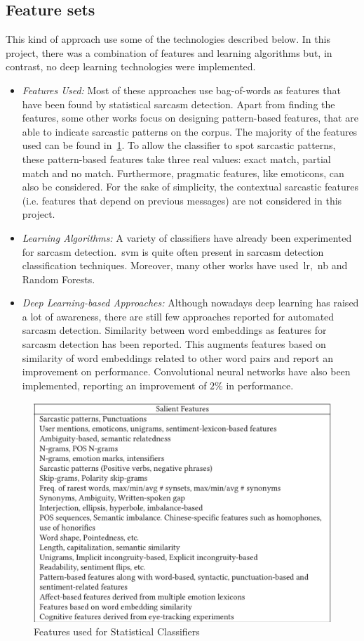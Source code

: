 \subsection{Feature sets \cite{joshi2017automatic}}
This kind of approach use some of the technologies described below. In this project, there was a combination of features and learning algorithms but, in contrast, no deep learning technologies were implemented.
\begin{itemize}
	\item \textit{Features Used:} Most of these approaches use bag-of-words as features that have been found by statistical sarcasm detection. Apart from finding the features, some other works focus on designing pattern-based features, that are able to indicate sarcastic patterns on the corpus. The majority of the features used can be found in~\cref{fig:featused}. To allow the classifier to spot sarcastic patterns, these pattern-based features take three real values: exact match, partial match and no match. Furthermore, pragmatic features, like emoticons, can also be considered. For the sake of simplicity, the contextual sarcastic features (i.e. features that depend on previous messages) are not considered in this project.
	\item \textit{Learning Algorithms:} A variety of classifiers have already been experimented for sarcasm detection.~\acf{svm} is quite often present in sarcasm detection classification techniques. Moreover, many other works have used~\acf{lr},~\acf{nb} and Random Forests.
	\item \textit{Deep Learning-based Approaches:} Although nowadays deep learning has raised a lot of awareness, there are still few approaches reported for automated sarcasm detection. Similarity between word embeddings as features for sarcasm detection has been reported. This augments features based on similarity of word embeddings related to other word pairs and report an improvement on performance. Convolutional neural networks have also been implemented, reporting an improvement of $2\%$ in performance.
\end{itemize}
\begin{figure}
\centering
\includegraphics[scale=0.25]{img/features.jpeg}
\caption{Features used for Statistical Classifiers~\cite{joshi2017automatic}}
\label{fig:featused}
\end{figure}
